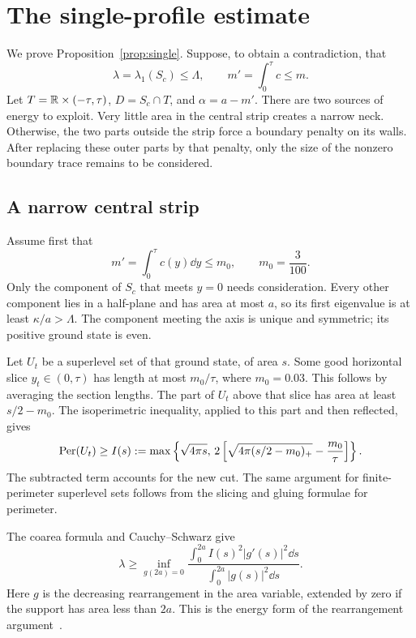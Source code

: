 \section{The single-profile estimate}\label{sec:one}
We prove Proposition~\ref{prop:single}. Suppose, to obtain a contradiction, that
\[
 \lambda=\lambda_1(S_c)\le\Lambda,
 \qquad m'=\int_0^\tau c\le m.
\]
Let $T=\mathbb R\times(-\tau,\tau)$, $D=S_c\cap T$, and $\alpha=a-m'$. There are two sources of energy to exploit. Very little area in the central strip creates a narrow neck. Otherwise, the two parts outside the strip force a boundary penalty on its walls. After replacing these outer parts by that penalty, only the size of the nonzero boundary trace remains to be considered.

\subsection{A narrow central strip}
Assume first that
\[
 m'=\int_0^\tau c(y)\dd y\le m_0,\qquad m_0=\frac3{100}.
\]
Only the component of $S_c$ that meets $y=0$ needs consideration. Every other component lies in a half-plane and has area at most $a$, so its first eigenvalue is at least $\kappa/a>\Lambda$. The component meeting the axis is unique and symmetric; its positive ground state is even.

Let $U_t$ be a superlevel set of that ground state, of area $s$. Some good horizontal slice $y_t\in(0,\tau)$ has length at most $m_0/\tau$, where $m_0=0.03$. This follows by averaging the section lengths. The part of $U_t$ above that slice has area at least $s/2-m_0$. The isoperimetric inequality, applied to this part and then reflected, gives
\begin{equation}\label{eq:neck}
 \operatorname{Per}(U_t)\ge I(s):=
 \max\left\{\sqrt{4\pi s},\,
 2\left[\sqrt{4\pi(s/2-m_0)_+}-\frac{m_0}{\tau}\right]\right\}.
\end{equation}
The subtracted term accounts for the new cut. The same argument for finite-perimeter superlevel sets follows from the slicing and gluing formulae for perimeter.

The coarea formula and Cauchy--Schwarz give
\begin{equation}\label{eq:neck-quotient}
 \lambda\ge\inf_{g(2a)=0}
 \frac{\int_0^{2a}I(s)^2|g'(s)|^2\dd s}{\int_0^{2a}|g(s)|^2\dd s}.
\end{equation}
Here $g$ is the decreasing rearrangement in the area variable, extended by zero if the support has area less than $2a$. This is the energy form of the rearrangement argument~\cite{Talenti,BrothersZiemer}.

